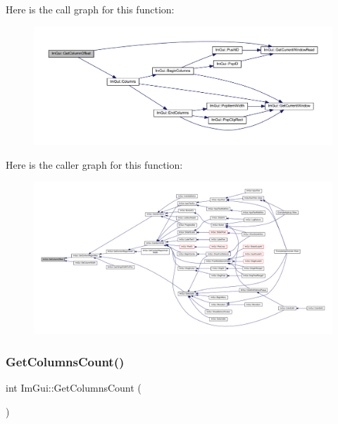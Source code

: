 Here is the call graph for this function\+:
\nopagebreak
\begin{figure}[H]
\begin{center}
\leavevmode
\includegraphics[width=350pt]{namespace_im_gui_a79c22e9c5c208b6c9534a273be71a9e6_cgraph}
\end{center}
\end{figure}
Here is the caller graph for this function\+:
\nopagebreak
\begin{figure}[H]
\begin{center}
\leavevmode
\includegraphics[width=350pt]{namespace_im_gui_a79c22e9c5c208b6c9534a273be71a9e6_icgraph}
\end{center}
\end{figure}
\mbox{\label{namespace_im_gui_a3c2998ad9527948a4e4166c4f7db9ec9}} 
\subsubsection{\texorpdfstring{Get\+Columns\+Count()}{GetColumnsCount()}}
{\footnotesize\ttfamily int Im\+Gui\+::\+Get\+Columns\+Count (\begin{DoxyParamCaption}{ }\end{DoxyParamCaption})}

